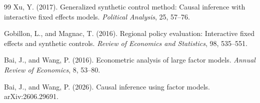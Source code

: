 \documentclass{article}
\begin{document}
\begin{thebibliography}{99}
   Xu, Y. (2017). Generalized synthetic control method: Causal inference with interactive fixed effects models. \emph{Political Analysis}, 25, 57--76.

   Gobillon, L., and Magnac, T. (2016). Regional policy evaluation: Interactive fixed effects and synthetic controls. \emph{Review of Economics and Statistics}, 98, 535--551.

   Bai, J., and Wang, P. (2016). Econometric analysis of large factor models. \emph{Annual Review of Economics}, 8, 53--80.

   Bai, J., and Wang, P. (2026). Causal inference using factor models. arXiv:2606.29691.

\end{thebibliography}
\end{document}
